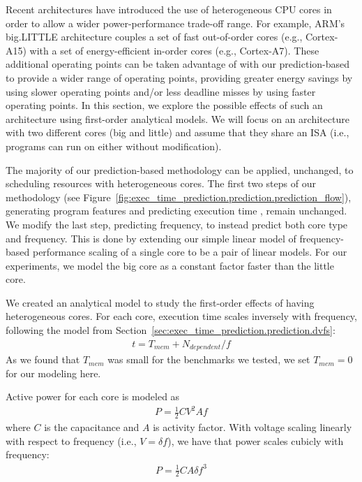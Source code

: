 Recent architectures have introduced the use of heterogeneous CPU cores in
order to allow a wider power-performance trade-off range. For example, ARM's
big.LITTLE architecture couples a set of fast out-of-order cores (e.g.,
Cortex-A15) with a set of energy-efficient in-order cores (e.g., Cortex-A7).
These additional operating points can be taken advantage of with our
prediction-based to provide a wider range of operating points, providing
greater energy savings by using slower operating points and/or less deadline
misses by using faster operating points. In this section, we explore the
possible effects of such an architecture using first-order analytical models.
We will focus on an architecture with two different cores (big and little) and
assume that they share an ISA (i.e., programs can run on either without
modification).

The majority of our prediction-based methodology can be applied, unchanged, to
scheduling resources with heterogeneous cores. The first two steps of our
methodology (see
Figure~\ref{fig:exec_time_prediction.prediction.prediction_flow}), generating
program features and predicting execution time , remain unchanged. We modify
the last step, predicting frequency, to instead predict both core type and
frequency.  This is done by extending our simple linear model of
frequency-based performance scaling of a single core to be a pair of linear
models. For our experiments, we model the big core as a constant factor faster
than the little core.

We created an analytical model to study the first-order effects of having
heterogeneous cores. For each core, execution time scales inversely with
frequency, following the model from
Section~\ref{sec:exec_time_prediction.prediction.dvfs}:
\begin{align*}
  t = T_{mem} + N_{dependent}/f
\end{align*}
As we found that $T_{mem}$ was small for the benchmarks we tested, we set $T_{mem}
= 0$ for our modeling here.

Active power for each core is modeled as
\begin{align*}
  P = \frac{1}{2}CV^2Af
\end{align*}
where $C$ is the capacitance and $A$ is activity factor. With voltage scaling
linearly with respect to frequency (i.e., $V = \delta f$), we have that power
scales cubicly with frequency:
\begin{align*}
  P = \frac{1}{2}CA\delta f^3
\end{align*}

